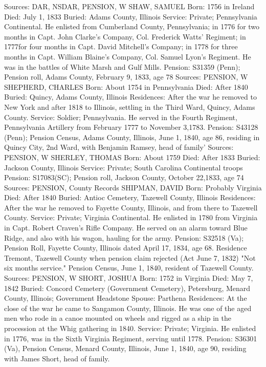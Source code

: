 Sources: DAR, NSDAR, PENSION, W 
SHAW, SAMUEL
Born:  1756 in Ireland
Died:   July 1, 1833
Buried:  Adams County, Illinois
Service:  Private; Pennsylvania Continental. He enlisted from Cumberland County, 
Pennsylvania; in 1776 for two months in Capt. John Clarke's Company, Col. Frederick Watts' Regiment; in 1777for four months in Capt. David Mitchell's Company; in 1778 for three months in Capt. William Blaine's Company, Col. Samuel Lyon's Regiment. He was in the battles of White Marsh and Gulf Mills. 
Pension: S31359 (Penn); Pension roll, Adams County, February 9, 1833, age 78 
Sources: PENSION, W 
SHEPHERD, CHARLES
Born: About 1754 in Pennsylvania
Died: After 1840
Buried: Quincy, Adams County, Illinois 
Residences: After the war he removed to New York and after 1818 to Illinois, settling in the Third Ward,  Quincy, Adams County.
Service: Soldier; Pennsylvania. He served in the Fourth Regiment, Pennsylvania Artillery from February 1777 to November 3,1783. 
Pension: S43128 (Penn); Pension Census, Adams County, Illinois, June 1, 1840, age 86, residing in Quincy City, 2nd Ward, with Benjamin Ramsey, head of family’
Sources: PENSION, W 
SHERLEY, THOMAS
Born: About 1759
Died: After 1833
Buried: Jackson County, Illinois 
Service: Private; South Carolina Continental troops 
Pension: S17083(SC); Pension roll, Jackson County, October 22,1833, age 74
Sources: PENSION, County Records 
SHIPMAN, DAVID
Born: Probably Virginia Died: After 1840 
Buried: Antioc Cemetery, Tazewell County, Illinois 
Residences: After the war he removed to Fayette County, Illinois, and from there to Tazewell County. 
Service: Private; Virginia Continental. He enlisted in 1780 from Virginia in Capt. Robert Craven's Rifle Company. He served on an alarm toward Blue Ridge, and also with his wagon, hauling for the army.
Pension: S32518 (Va); Pension Roll, Fayette County, Illinois dated April 17, 1834, age 68. Residence Tremont, Tazewell County when pension claim rejected (Act June 7, 1832) "Not six months service." Pension Census, June 1, 1840, resident of Tazewell County. 
Sources: PENSION, W 
SHORT, JOSHUA 
Born: 1752 in Virginia 
Died: May 7, 1842 
Buried: Concord Cemetery (Government Cemetery), Petersburg, Menard County, Illinois; Government Headstone
Spouse:  Parthena 
Residences: At the close of the war he came to Sangamon County, Illinois. He was one of the aged men who rode in a canoe mounted on wheels and rigged as a ship in the procession at the Whig gathering in 1840.
Service:  Private; Virginia. He enlisted in 1776, was in the Sixth Virginia Regi­ment, serving until 1778. 
Pension: S36301 (Va), Pension Census, Menard County, Illinois, June 1, 1840, age 90, residing with James Short, head of family.
